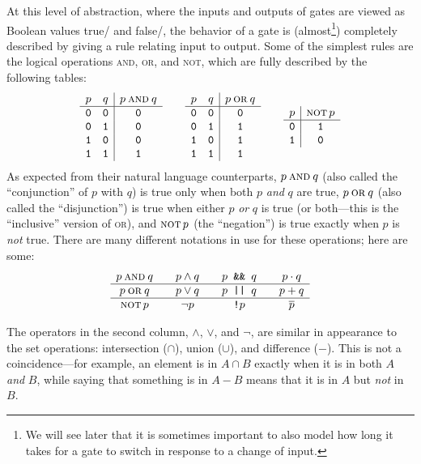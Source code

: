 At this level of abstraction, where the inputs and outputs of gates are viewed as Boolean values true/\1 and false/\0, the behavior of a gate is (almost\footnote{We will see later that it is sometimes important to also model how long it takes for a gate to switch in response to a change of input.}) completely described by giving a rule relating input to output. Some of the simplest rules are the logical operations \textsc{and}, \textsc{or}, and \textsc{not}, which are fully described by the following tables:
\[
\begin{array}{cc|c}
p & q & p\mathbin{\textsc{and}} q\\ \hline
\mathtt{0} & \mathtt{0} & \mathtt{0}\\
\mathtt{0} & \mathtt{1} & \mathtt{0}\\
\mathtt{1} & \mathtt{0} & \mathtt{0}\\
\mathtt{1} & \mathtt{1} & \mathtt{1}
\end{array}\qquad
\begin{array}{cc|c}
p & q & p\mathbin{\textsc{or}} q\\ \hline
\mathtt{0} & \mathtt{0} & \mathtt{0}\\
\mathtt{0} & \mathtt{1} & \mathtt{1}\\
\mathtt{1} & \mathtt{0} & \mathtt{1}\\
\mathtt{1} & \mathtt{1} & \mathtt{1}
\end{array}\qquad
\begin{array}{c|c}
p & \mathop{\textsc{not}} p\\ \hline
\mathtt{0} & \mathtt{1}\\
\mathtt{1} & \mathtt{0}
\end{array}
\]
As expected from their natural language counterparts, $p\mathbin{\textsc{and}} q$ (also called the ``conjunction'' of $p$ with $q$) is true only when both $p$ \emph{and} $q$ are true, $p\mathbin{\textsc{or}} q$ (also called the ``disjunction'') is true when either $p$ \emph{or} $q$ is true (or both---this is the ``inclusive'' version of \textsc{or}), and $\mathop{\textsc{not}} p$ (the ``negation'') is true exactly when $p$ is \emph{not} true. There are many different notations in use for these operations; here are some:
\[ \begin{array}{c@{\qquad}c@{\qquad}c@{\qquad}c}
p\engAND q & p\land q & p\verb| && |q & p\cdot q\\ \hline
p\engOR q  & p\lor q  & p\verb- || -q & p+q\\ \hline
\engNOT p  & \lnot p  & \verb|!|p     & \overline{p}
\end{array} \]

The operators in the second column, $\land$, $\lor$, and $\lnot$, are similar in appearance to the set operations: intersection ($\cap$), union ($\cup$), and difference ($-$). This is not a coincidence---for example, an element is in $A\cap B$ exactly when it is in both $A$ \emph{and} $B$, while saying that something is in $A-B$ means that it is in $A$ but \emph{not} in $B$.

